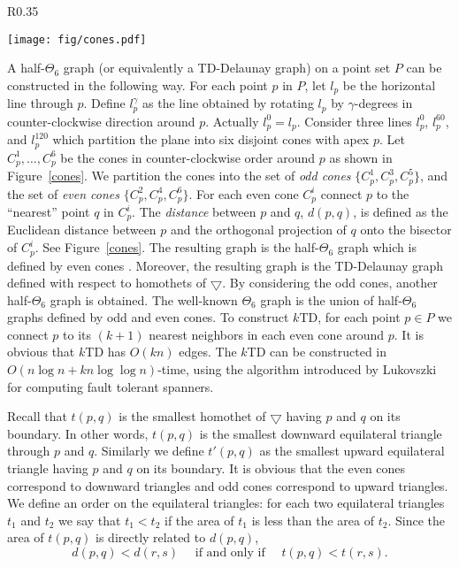 \documentclass[11pt,a4paper]{article}
\newcommand{\ConvexShape}{\bigtriangledown}
\newcommand{\kTD}[2]{$#1$\text{-}TD#2}
\begin{document}
\begin{wrapfigure}{R}{0.35\textwidth}
  \begin{center}
\texttt{[image: fig/cones.pdf]}
  \end{center}
  \caption{The construction of the TD-Delaunay graph.}
\label{cones}
\end{wrapfigure}

A half-$\Theta_6$ graph (or equivalently a TD-Delaunay graph) on a point set $P$ can be constructed in the following way. For each point $p$ in $P$, let $l_p$ be the horizontal line through $p$. Define $l_p^{\gamma}$ as the line obtained by rotating $l_p$ by $\gamma$-degrees in counter-clockwise direction around $p$. Actually $l_p^0=l_p$. Consider three lines $l_p^{0}$, $l_p^{60}$, and $l_p^{120}$ which partition the plane into six disjoint cones with apex $p$. Let $C_p^1, \dots, C_p^6$ be the cones in counter-clockwise order around $p$ as shown in Figure~\ref{cones}. We partition the cones into the set of {\em odd cones} $\{C_p^1,C_p^3,C_p^5\}$, and the set of {\em even cones} $\{C_p^2,C_p^4,C_p^6\}$. For each even cone $C_p^i$ connect $p$ to the ``nearest'' point $q$ in $C_p^i$. The {\em distance} between $p$ and $q$, $d(p,q)$, is defined as the Euclidean distance between $p$ and the orthogonal projection of $q$ onto the bisector of $C_p^i$. See Figure~\ref{cones}. The resulting graph is the half-$\Theta_6$ graph which is defined by even cones \cite{Bonichon2010}. Moreover, the resulting graph is the TD-Delaunay graph defined with respect to homothets of $\ConvexShape$. By considering the odd cones, another half-$\Theta_6$ graph is obtained. The well-known $\Theta_6$ graph is the union of half-$\Theta_6$ graphs defined by odd and even cones. To construct \kTD{k}{}, for each point $p\in P$ we connect $p$ to its $(k+1)$ nearest neighbors in each even cone around $p$. It is obvious that \kTD{k}{} has $O(kn)$ edges. The \kTD{k}{} can be constructed in $O(n\log n+kn\log \log n)$-time, using the algorithm introduced by Lukovszki~\cite{Lukovszki1999} for computing fault tolerant spanners.

Recall that $t(p,q)$ is the smallest homothet of $\ConvexShape$ having $p$ and $q$ on its boundary. In other words, $t(p,q)$ is the smallest downward equilateral triangle through $p$ and $q$. Similarly we define $t'(p,q)$ as the smallest upward equilateral triangle having $p$ and $q$ on its boundary. It is obvious that the even cones correspond to downward triangles and odd cones correspond to upward triangles.   
We define an order on the equilateral triangles: for each two equilateral triangles $t_1$ and $t_2$ we say that $t_1<t_2$ if the area of $t_1$ is less than the area of $t_2$. Since the area of $t(p,q)$ is directly related to $d(p,q)$, 
$$d(p,q)<d(r,s) \quad\text{ if and only if }\quad t(p,q)<t(r,s).$$
\end{document}
